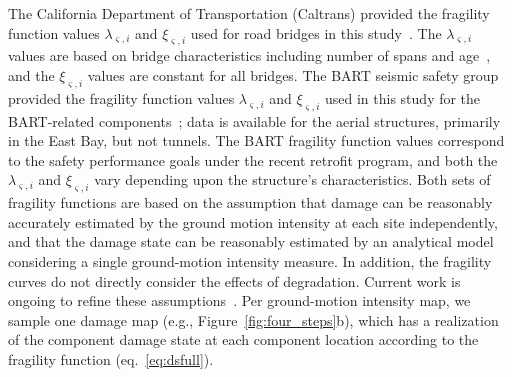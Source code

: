The California Department of Transportation (Caltrans) provided the fragility function values $\lambda_{\varsigma,i}$ and $\xi_{\varsigma,i}$ used for road bridges in this study~\cite{caltrans_caltrans_2013}. The $\lambda_{\varsigma,i}$ values are based on bridge characteristics including number of spans and age~\cite{basoz_enhancement_1999}, and the $\xi_{\varsigma,i}$ values are constant for all bridges. The BART seismic safety group provided the  fragility function values $\lambda_{\varsigma,i}$ and $\xi_{\varsigma,i}$ used in this study for the BART-related components~\cite{bechtel/hntb_team_design_2008}; data is available for the aerial structures, primarily in the East Bay, but not tunnels. The BART fragility function values correspond to the safety performance goals under the recent retrofit program, and both the $\lambda_{\varsigma,i}$ and $\xi_{\varsigma,i}$ vary depending upon the structure's characteristics. Both sets of fragility functions are based on the assumption that damage can be reasonably accurately estimated by the ground motion intensity at each site independently, and that the damage state can be reasonably estimated by an analytical model considering a single ground-motion intensity measure.  In addition, the fragility curves do not directly consider the effects of degradation. Current work is ongoing to refine these assumptions~\cite[e.g.,][]{ramanathan_next_2012,kurtz_time-varying_2014,ghosh_seismic_2013}. Per ground-motion intensity map, we sample one damage map (e.g., Figure~\ref{fig:four_steps}{b}), which has a realization of the component damage state at each component location according to the fragility function (eq.~\ref{eq:dsfull}). 



%



